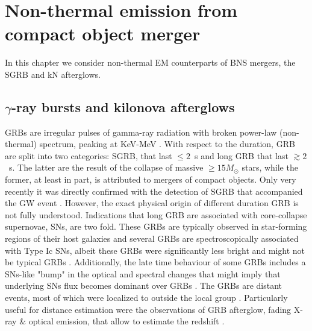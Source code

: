 
\chapter{Non-thermal emission from compact object merger} \label{ch:afterglow} 

In this chapter we consider non-thermal \ac{EM} counterparts of \ac{BNS} 
mergers, the \ac{SGRB} and \ac{kN} afterglows.





\section{$\gamma$-ray bursts and kilonova afterglows}

\acp{GRB} are irregular pulses of gamma-ray radiation with broken power-law 
(non-thermal) spectrum, peaking at KeV-MeV \citep{Band:1993,Kouveliotou:1993,Meegan:1992xg}.
%
With respect to the duration, \ac{GRB} are split into two categories: \ac{SGRB}, 
that last ${\leq}2$~s and long \ac{GRB} that last ${\gtrsim}2$~s. The latter are the 
result of the collapse of massive ${\geq}15M_{\odot}$ stars, while the former, at 
least in part, is attributed to mergers of compact objects. Only very recently it 
was directly confirmed with the detection of \ac{SGRB} \GRB{} that accompanied 
the \ac{GW} event \GW{} \citep{TheLIGOScientific:2017qsa}. However, the exact physical 
origin of different duration \ac{GRB} is not fully understood.
%
Indications that long \ac{GRB} are associated with core-collapse supernovae, \acp{SN}, 
are two fold. These \acp{GRB} are typically observed in star-forming regions of their 
host galaxies \citep[\eg][]{Bloom:2000pq,Bloom:2002hc,Fruchter:2006py,Christensen:2004yx,CastroCeron:2006jh} 
and several \acp{GRB} are spectroscopically associated with Type Ic \acp{SN}, albeit 
these \acp{GRB} were significantly less bright and might not be typical \acp{GRB} 
\citep[\eg][]{Liang:2006ci,Bromberg:2011fm}. Additionally, the late time behaviour 
of some \acp{GRB} includes a \acp{SN}-like "bump" in the optical and spectral changes 
that might imply that underlying \acp{SN} flux becomes dominant over \acp{GRB} 
\citep[\eg][]{Bloom:1999,Woosley:2006fn}.
%
The \acp{GRB} are distant events, most of which were localized to outside the local 
group \citep[\eg][]{Mao:1992,Piran:1992,Fenimore:1993}. Particularly useful for distance 
estimation were the observations of \ac{GRB} afterglow, fading X-ray \& optical emission, 
that allow to estimate the redshift \citep[\eg][]{Costa:1997cg,Frontera:1997ae}.
